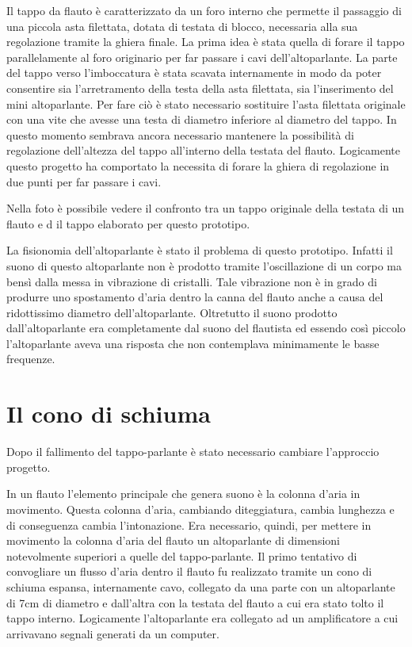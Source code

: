 Il tappo da flauto è caratterizzato da un foro interno che permette il passaggio di una piccola asta filettata, dotata di testata di blocco, necessaria alla sua regolazione tramite la ghiera finale.
La prima idea è stata quella di forare il tappo  parallelamente al foro originario per far passare i cavi dell’altoparlante.
La parte del tappo verso l’imboccatura è stata scavata internamente in modo da poter consentire sia l’arretramento della testa della asta filettata, sia l’inserimento del mini altoparlante.
Per fare ciò è stato necessario sostituire l’asta filettata originale con una vite che avesse una testa di diametro inferiore al diametro del tappo. In questo momento sembrava ancora necessario mantenere la possibilità di regolazione dell’altezza del tappo all’interno della testata del flauto.
Logicamente questo progetto ha comportato la necessita di forare la ghiera di regolazione in due punti per far passare i cavi.

Nella foto è possibile vedere il confronto tra un tappo originale della testata di un flauto e d il tappo elaborato per questo prototipo.

La fisionomia dell’altoparlante è stato il problema di questo prototipo.
Infatti il suono di questo altoparlante non è prodotto tramite l’oscillazione di un corpo ma bensì dalla messa in vibrazione di cristalli. Tale vibrazione non è in grado di  produrre uno spostamento d’aria dentro la canna del flauto anche a causa del ridottissimo diametro dell’altoparlante. Oltretutto il suono prodotto dall’altoparlante era completamente dal suono del flautista ed essendo così piccolo l’altoparlante aveva una risposta che non contemplava minimamente le basse frequenze.

\section{Il cono di schiuma}

Dopo il fallimento del tappo-parlante è stato necessario cambiare l’approccio  progetto.

In un flauto l’elemento principale che genera suono è la colonna d’aria in movimento. Questa colonna d’aria, cambiando diteggiatura, cambia lunghezza e di conseguenza cambia l’intonazione.
Era necessario, quindi, per mettere in movimento la colonna d’aria del flauto un altoparlante di dimensioni notevolmente superiori a quelle del tappo-parlante.
Il primo tentativo di convogliare un flusso d’aria dentro il flauto fu realizzato tramite un cono di schiuma espansa, internamente cavo, collegato da una parte con un altoparlante di 7cm di diametro e dall’altra con la testata del flauto a cui era stato tolto il tappo interno. Logicamente l’altoparlante era collegato ad un amplificatore a cui arrivavano segnali generati da un computer.

